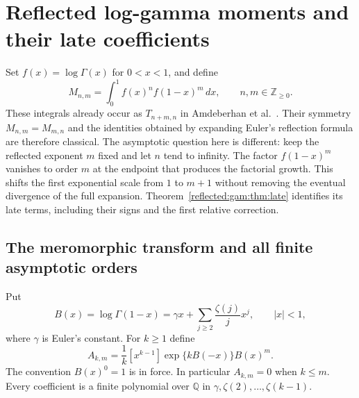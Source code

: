 \section{Reflected log-gamma moments and their late coefficients}
\label{reflected:sec:reflected-moments}

Set $f(x)=\log\Gamma(x)$ for $0<x<1$, and define
\[
 M_{n,m}=\int_0^1 f(x)^n f(1-x)^m\,dx,
 \qquad n,m\in\mathbb Z_{\ge0}.
\]
These integrals already occur as $T_{n+m,n}$ in
Amdeberhan et al.\ \cite[Section~5]{gaussian:ACEMKM}.  Their symmetry
$M_{n,m}=M_{m,n}$ and the identities obtained by expanding Euler's
reflection formula are therefore classical.  The asymptotic question here
is different: keep the reflected exponent $m$ fixed and let $n$ tend to
infinity.  The factor $f(1-x)^m$ vanishes to order $m$ at the endpoint
that produces the factorial growth.  This shifts the first exponential
scale from $1$ to $m+1$ without removing the eventual divergence of the
full expansion.  Theorem~\ref{reflected:gam:thm:late} identifies its late terms,
including their signs and the first relative correction.

\subsection{The meromorphic transform and all finite asymptotic orders}

Put
\[
 B(x)=\log\Gamma(1-x)
 =\gamma x+\sum_{j\ge2}\frac{\zeta(j)}j x^j,
 \qquad |x|<1,
\]
where $\gamma$ is Euler's constant.  For $k\ge1$ define
\begin{equation}\label{reflected:gam:eq:residue-coefficients}
 A_{k,m}=\frac1k[x^{k-1}]\exp\{kB(-x)\}B(x)^m.
\end{equation}
The convention $B(x)^0=1$ is in force.  In particular $A_{k,m}=0$
when $k\le m$.  Every coefficient is a finite polynomial over
$\mathbb Q$ in $\gamma,\zeta(2),\ldots,\zeta(k-1)$.

